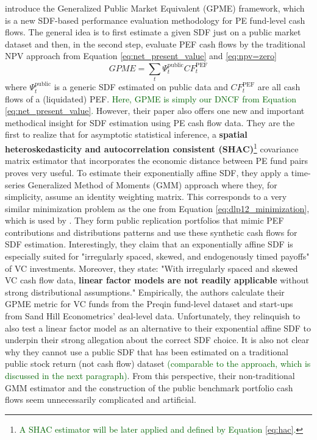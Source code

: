 \cite{KN16} introduce the Generalized Public Market Equivalent (GPME) framework, which is a new SDF-based performance evaluation methodology for PE fund-level cash flows.
The general idea is to first estimate a given SDF just on a public market dataset and then, in the second step, evaluate PEF cash flows by the traditional NPV approach from Equation \ref{eq:net_present_value} and \ref{eq:npv=zero}
\[
GPME = \sum_t \Psi_t^{\mathrm{public}} CF_t^{\mathrm{PEF}}
\]
where $\Psi_t^{\mathrm{public}}$ is a generic SDF estimated on public data and $CF_t^{\mathrm{PEF}}$ are all cash flows of a (liquidated) PEF.
\textcolor{darkgreen}{Here, GPME is simply our DNCF from Equation \ref{eq:net_present_value}.}
However, their paper also offers one new and important methodical insight for SDF estimation using PE cash flow data.
They are the first to realize that for asymptotic statistical inference, a \textbf{spatial heteroskedasticity and autocorrelation consistent (SHAC)}\footnote{\textcolor{darkgreen}{A SHAC estimator will be later applied and defined by Equation \ref{eq:hac}.}} covariance matrix estimator that incorporates the economic distance between PE fund pairs proves very useful.
To estimate their exponentially affine SDF, they apply a time-series Generalized Method of Moments (GMM) approach where they, for simplicity, assume an identity weighting matrix.
This corresponds to a very similar minimization problem as the one from Equation \ref{eq:dlp12_minimization}, which is used by \cite{DLP12}. 
They form public replication portfolios that mimic PEF contributions and distributions patterns and use these synthetic cash flows for SDF estimation. 
Interestingly, they claim that an exponentially affine SDF is especially suited for "irregularly spaced, skewed, and endogenously timed payoffs" of VC investments.
Moreover, they state: "With irregularly spaced and skewed VC cash flow data, \textbf{linear factor models are not readily applicable} without strong distributional assumptions."
Empirically, the authors calculate their GPME metric for VC funds from the Preqin fund-level dataset and start-ups from Sand Hill Econometrics' deal-level data.
Unfortunately, they relinquish to also test a linear factor model as an alternative to their exponential affine SDF to underpin their strong allegation about the correct SDF choice.
It is also not clear why they cannot use a public SDF that has been estimated on a traditional public stock return (not cash flow) dataset \textcolor{darkgreen}{(comparable to the \cite{GSW19} approach, which is discussed in the next paragraph)}.
From this perspective, their non-traditional GMM estimator and the construction of the public benchmark portfolio cash flows seem unnecessarily complicated and artificial.
